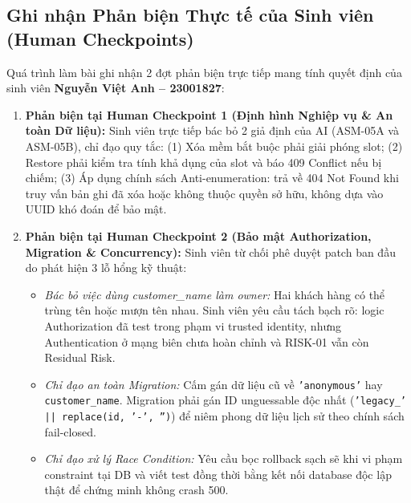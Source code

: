 \documentclass[10pt,a4paper]{article}
\begin{document}
\subsection{Ghi nhận Phản biện Thực tế của Sinh viên (Human Checkpoints)}
Quá trình làm bài ghi nhận 2 đợt phản biện trực tiếp mang tính quyết định của sinh viên \textbf{Nguyễn Việt Anh -- 23001827}:
\begin{enumerate}[leftmargin=1.1em,itemsep=0.4pt]
  \item \textbf{Phản biện tại Human Checkpoint 1 (Định hình Nghiệp vụ \& An toàn Dữ liệu):}
    Sinh viên trực tiếp bác bỏ 2 giả định của AI (ASM-05A và ASM-05B), chỉ đạo quy tắc: (1) Xóa mềm bắt buộc phải giải phóng slot; (2) Restore phải kiểm tra tính khả dụng của slot và báo 409 Conflict nếu bị chiếm; (3) Áp dụng chính sách Anti-enumeration: trả về 404 Not Found khi truy vấn bản ghi đã xóa hoặc không thuộc quyền sở hữu, không dựa vào UUID khó đoán để bảo mật.
  \item \textbf{Phản biện tại Human Checkpoint 2 (Bảo mật Authorization, Migration \& Concurrency):}
    Sinh viên từ chối phê duyệt patch ban đầu do phát hiện 3 lỗ hổng kỹ thuật:
    \begin{itemize}[leftmargin=0.9em,itemsep=0.1pt]
      \item \textit{Bác bỏ việc dùng customer\_name làm owner:} Hai khách hàng có thể trùng tên hoặc mượn tên nhau. Sinh viên yêu cầu tách bạch rõ: logic Authorization đã test trong phạm vi trusted identity, nhưng Authentication ở mạng biên chưa hoàn chỉnh và RISK-01 vẫn còn Residual Risk.
      \item \textit{Chỉ đạo an toàn Migration:} Cấm gán dữ liệu cũ về \texttt{'anonymous'} hay \texttt{customer\_name}. Migration phải gán ID unguessable độc nhất (\texttt{'legacy\_' || replace(id, '-', '')}) để niêm phong dữ liệu lịch sử theo chính sách fail-closed.
      \item \textit{Chỉ đạo xử lý Race Condition:} Yêu cầu bọc rollback sạch sẽ khi vi phạm constraint tại DB và viết test đồng thời bằng kết nối database độc lập thật để chứng minh không crash 500.
    \end{itemize}
\end{enumerate}
\end{document}

